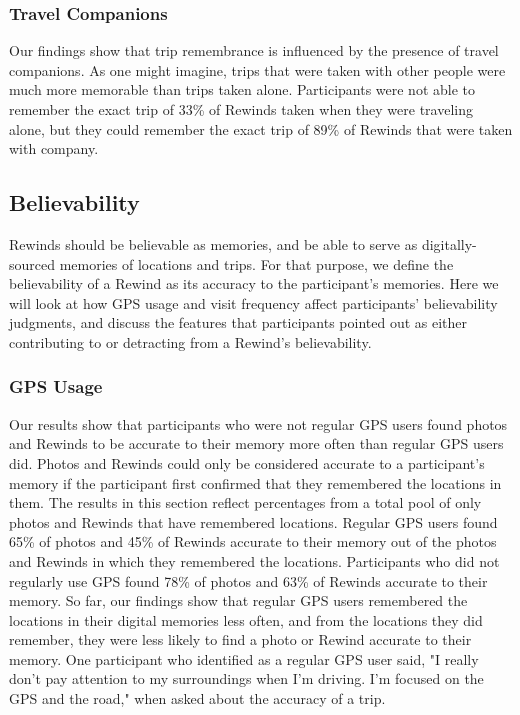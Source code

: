 \documentclass{sigchi}
\begin{document}
\subsubsection{Travel Companions}
Our findings show that trip remembrance is influenced by the presence of travel companions. As one might imagine, trips that were taken with other people were much more memorable than trips taken alone. Participants were not able to remember the exact trip of 33\% of Rewinds taken when they were traveling alone, but they could remember the exact trip of 89\% of Rewinds that were taken with company.

\subsection{Believability}
Rewinds should be believable as memories, and be able to serve as digitally-sourced memories of locations and trips. For that purpose, we define the believability of a Rewind as its accuracy to the participant's memories. Here we will look at how GPS usage and visit frequency affect participants' believability judgments, and discuss the features that participants pointed out as either contributing to or detracting from a Rewind's believability.

\subsubsection{GPS Usage}
Our results show that participants who were not regular GPS users found photos and Rewinds to be accurate to their memory more often than regular GPS users did. Photos and Rewinds could only be considered accurate to a participant's memory if the participant first confirmed that they remembered the locations in them. The results in this section reflect percentages from a total pool of only photos and Rewinds that have remembered locations. Regular GPS users found 65\% of photos and 45\% of Rewinds accurate to their memory out of the photos and Rewinds in which they remembered the locations. Participants who did not regularly use GPS found 78\% of photos and 63\% of Rewinds accurate to their memory. So far, our findings show that regular GPS users remembered the locations in their digital memories less often, and from the locations they did remember, they were less likely to find a photo or Rewind accurate to their memory. One participant who identified as a regular GPS user said, "I really don't pay attention to my surroundings when I'm driving. I'm focused on the GPS and the road," when asked about the accuracy of a trip.
\end{document}
